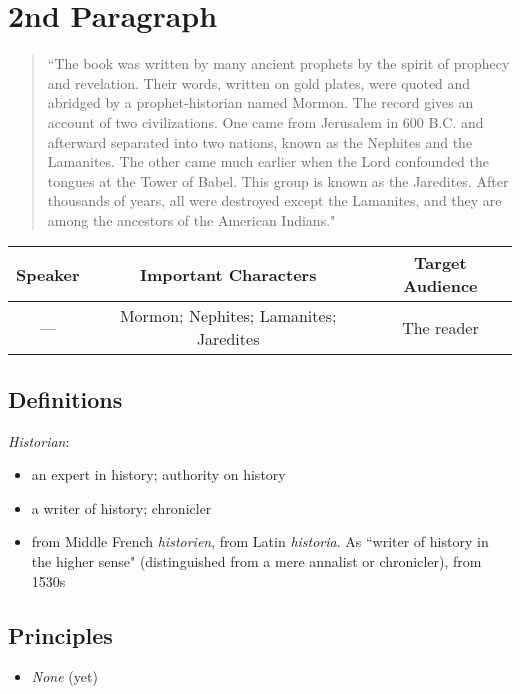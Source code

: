 \documentclass[12pt]{report}
\begin{document}
\section{2nd Paragraph\label{intro:2nd}}
\begin{center}
\begin{quote}
``The book was written by many ancient prophets by the spirit of prophecy and revelation.  Their words, written on gold plates, were quoted and abridged by a prophet-historian named Mormon.  The record gives an account of two civilizations.  One came from Jerusalem in 600 \scriptsize B.C. \normalsize and afterward separated into two nations, known as the Nephites and the Lamanites.  The other came much earlier when the Lord confounded the tongues at the Tower of Babel.  This group is known as the Jaredites.  After thousands of years, all were destroyed except the Lamanites, and they are among the ancestors of the American Indians."
\end{quote}
\end{center}

\begin{table}[h!]
\centering
\label{table:intro2}
\begin{tabular*}{\textwidth}{c @{\extracolsep{\fill}}cc}
Speaker & Important Characters & Target Audience \\
\hline
\rule{0pt}{3ex} --- & Mormon; Nephites; Lamanites; Jaredites & The reader 
\end{tabular*}
\end{table}

\subsection{Definitions\label{intro:DFN2}}
\emph{Historian}:
\begin{itemize}
\item an expert in history; authority on history
\item a writer of history; chronicler
\item from Middle French \emph{historien}, from Latin \emph{historia}. As ``writer of history in the higher sense" (distinguished from a mere annalist or chronicler), from 1530s
\end{itemize} 

\subsection{Principles\label{intro:principles2}}
\begin{itemize}
\item \emph{None} (yet)
\end{itemize}
\end{document}
